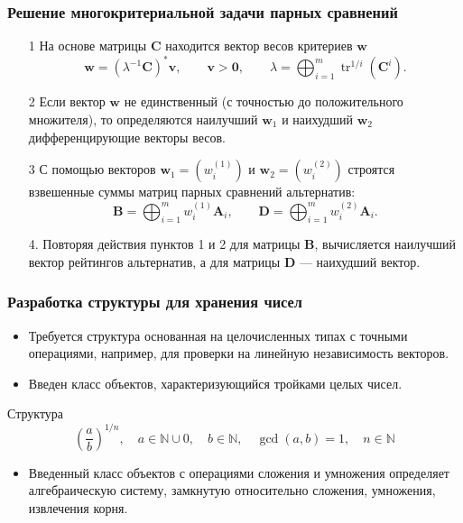 \documentclass[ucs, notheorems, handout]{beamer}
\begin{document}
\begin{frame}
    \frametitle{Решение многокритериальной задачи парных сравнений}
    \begin{itemize}
        \item[1] На основе матрицы $\bm{C}$ находится вектор весов критериев $\bm{w}$
        $$\bm{w} =
        (\lambda^{-1}\bm{C})^{\ast}\bm{v},
        \qquad \bm{v}>\bm{0},
        \qquad \lambda =
        \bigoplus_{i=1}^{m}{\mathop\mathrm{tr}}^{1/i}(\bm{C}^{i}).$$
        \item[2] Если вектор $\bm{w}$ не единственный (с точностью до положительного множителя), то определяются наилучший $\bm{w}_{1}$ и наихудший $\bm{w}_{2}$ дифференцирующие векторы весов.
        \item[3]
        С помощью векторов $\bm{w}_{1}=(w_{i}^{(1)})$ и $\bm{w}_{2}=(w_{i}^{(2)})$ строятся взвешенные суммы матриц парных сравнений альтернатив:
        $$\bm{B} =
        \bigoplus_{i=1}^{m}w^{(1)}_{i}\bm{A}_{i},
        \qquad \bm{D} =
        \bigoplus_{i=1}^{m}w^{(2)}_{i}\bm{A}_{i}.$$
        \item[4.]
        Повторяя действия пунктов 1 и 2 для матрицы $\bm{B}$, вычисляется наилучший вектор рейтингов альтернатив, а для матрицы $\bm{D}$ --- наихудший вектор.
 
    \end{itemize}
\end{frame}

\begin{frame}
    \frametitle{Разработка структуры для хранения чисел}

    \begin{itemize}
        \item Требуется структура основанная на целочисленных типах с точными операциями, например, для проверки на линейную независимость векторов.
        \item Введен класс объектов, характеризующийся тройками целых чисел.
    \end{itemize}
    \begin{block}{Структура}
        $$\displaystyle \left(\frac{a}{b}\right)^{1/n}, \quad a \in \mathbb{N} \cup 0, \quad b \in \mathbb{N}, \quad \gcd(a, b) = 1, \quad n \in \mathbb{N}$$
    \end{block}
    \begin{itemize}
        \item Введенный класс объектов с операциями сложения и умножения определяет алгебраическую систему, замкнутую относительно сложения, умножения, извлечения корня.
    \end{itemize}

\end{frame}
\end{document}

